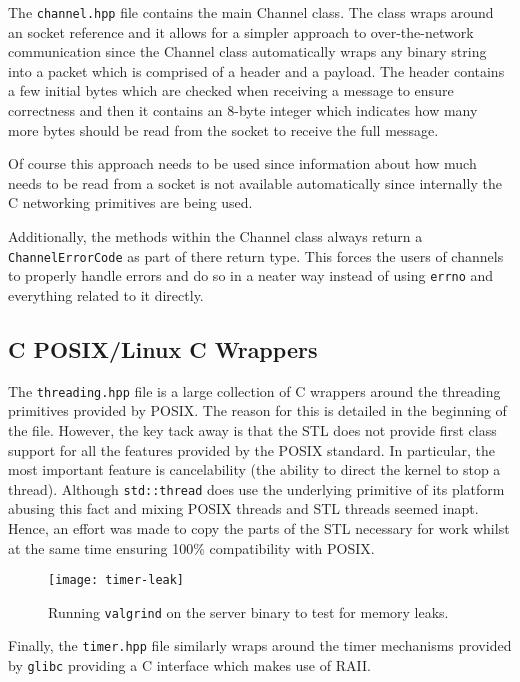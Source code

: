 \documentclass[article]{uom-coursework}
\def\CC{{C\nolinebreak\raisebox{.25ex}{\scriptsize\bfseries{++}}}}
\begin{document}
The \texttt{channel.hpp} file contains the main Channel class.
The class wraps around an socket reference and it allows for a
simpler approach to over-the-network communication since the
Channel class automatically wraps any binary string into a
packet which is comprised of a header and a payload. The header
contains a few initial bytes which are checked when receiving a
message to ensure correctness and then it contains an  8-byte
integer which indicates how many more bytes should be read from
the socket to receive the full message.

Of course this approach needs to be used since information about
how much needs to be read from a socket is not available
automatically since internally the C networking primitives are
being used.

Additionally, the methods within the Channel class always return
a \texttt{ChannelErrorCode} as part of there return type. This
forces the users of channels to properly handle errors and do so
in a neater way instead of using \texttt{errno} and everything
related to it directly.

\subsection{\CC{} POSIX/Linux C Wrappers}\label{sec:posixwrappers}

The \texttt{threading.hpp} file is a large collection of \CC{}
wrappers around the threading primitives provided by POSIX. The
reason for this is detailed in the beginning of the file.
However, the key tack away is that the STL does not provide
first class support for all the features provided by the POSIX
standard. In particular, the most important feature is
cancelability (the ability to direct the kernel to stop a
thread). Although \texttt{std::thread} does use the underlying
primitive of its platform abusing this fact and mixing POSIX
threads and STL threads seemed inapt. Hence, an effort was made
to copy the parts of the STL necessary for work whilst at the
same time ensuring 100\% compatibility with POSIX.

\begin{figure}[H]
\centering
\texttt{[image: timer-leak]}
\caption{Running \texttt{valgrind} on the server binary to test
for memory leaks.}
\label{fig:timerleak}
\end{figure}

Finally, the \texttt{timer.hpp} file similarly wraps around the
timer mechanisms provided by \texttt{glibc} providing a \CC{}
interface which makes use of RAII.
\end{document}
